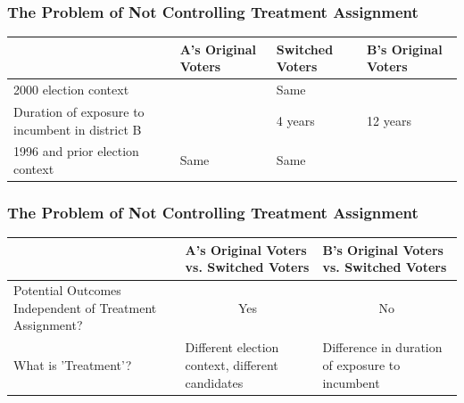 \documentclass[xcolor=x11names,compress]{beamer}\usepackage[]{graphicx}\usepackage[]{color}
\renewcommand{\(}{\begin{columns}}
\renewcommand{\)}{\end{columns}}
\newcommand{\<}[1]{\begin{column}{#1}}
\renewcommand{\>}{\end{column}}
\begin{document}
\begin{frame}
\frametitle{The Problem of Not Controlling Treatment Assignment}
\footnotesize
\begin{table}[htbp]
  \centering
    \begin{tabular}{|p{3cm}|p{2.4cm}|p{2.4cm}|p{2.4cm}|}
    \hline
          & \textbf{A's Original Voters} & \textbf{Switched Voters} & \multicolumn{1}{p{2.4cm}}{\textbf{B's Original Voters}} \bigstrut\\
    \hline
    2000 election context &       & \cellcolor[rgb]{ .776,  .878,  .706}Same  & \cellcolor[rgb]{ .776,  .878,  .706}\multicolumn{1}{p{2.4cm}}{Same} \bigstrut\\
    \hline
    Duration of exposure to incumbent in district B &       & 4 years & \multicolumn{1}{p{2.4cm}}{12 years} \bigstrut\\
    \hline
    1996 and prior election context & \cellcolor[rgb]{ .776,  .878,  .706}Same  & \cellcolor[rgb]{ .776,  .878,  .706}Same  &  \bigstrut\\
    \hline
    \end{tabular}%
  \label{tab:addlabel}%
\end{table}
\normalsize
\end{frame}

\begin{frame}
\frametitle{The Problem of Not Controlling Treatment Assignment}
\footnotesize
\begin{table}[htbp]
  \centering
    \begin{tabular}{|p{3.2cm}|p{2.6cm}|p{2.6cm}|}
    \hline
          & \textbf{A's Original Voters vs. Switched Voters} & \textbf{B's Original Voters vs. Switched Voters} \bigstrut\\
    \hline
    Potential Outcomes Independent of Treatment Assignment? & \multicolumn{1}{c|}{\cellcolor[rgb]{ .776,  .878,  .706} Yes} & \multicolumn{1}{c|}{No} \bigstrut\\
    \hline
    What is 'Treatment'? & Different election context, different candidates & \cellcolor[rgb]{ .776,  .878,  .706} Difference in duration of exposure to incumbent \bigstrut\\
    \hline
    \end{tabular}%
  \label{tab:addlabel}%
\end{table}%
\normalsize
\end{frame}
\end{document}
